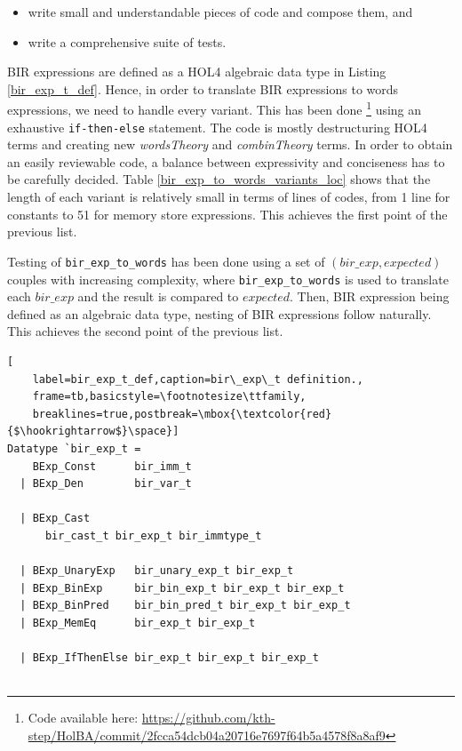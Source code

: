 \documentclass{kththesis}
\begin{document}
{\begin{itemize}
    \item write small and understandable pieces of code and compose them, and
    \item write a comprehensive suite of tests.
\end{itemize}

BIR expressions are defined as a HOL4 algebraic data type in Listing \ref{bir_exp_t_def}. Hence, in order to translate BIR expressions to words expressions, we need to handle every variant. This has been done \footnote{Code available here: \url{https://github.com/kth-step/HolBA/commit/2fcca54dcb04a20716e7697f64b5a4578f8a8af9}} using an exhaustive \texttt{if-then-else} statement\footnotemark. The code is mostly destructuring HOL4 terms and creating new \textit{wordsTheory} and \textit{combinTheory} terms. In order to obtain an easily reviewable code, a balance between expressivity and conciseness has to be carefully decided. Table \ref{bir_exp_to_words_variants_loc} shows that the length of each variant is relatively small in terms of lines of codes, from 1 line for constants to 51 for memory store expressions. This achieves the first point of the previous list.


Testing of \texttt{bir\_exp\_to\_words} has been done using a set of $(bir\_exp,expected)$ couples with increasing complexity, where \texttt{bir\_exp\_to\_words} is used to translate each $bir\_exp$ and the result is compared to $expected$. Then, BIR expression being defined as an algebraic data type, nesting of BIR expressions follow naturally. This achieves the second point of the previous list.

\begin{lstlisting}[
    label=bir_exp_t_def,caption=bir\_exp\_t definition.,
    frame=tb,basicstyle=\footnotesize\ttfamily,
    breaklines=true,postbreak=\mbox{\textcolor{red}{$\hookrightarrow$}\space}]
Datatype `bir_exp_t =
    BExp_Const      bir_imm_t
  | BExp_Den        bir_var_t

  | BExp_Cast
  	  bir_cast_t bir_exp_t bir_immtype_t

  | BExp_UnaryExp   bir_unary_exp_t bir_exp_t
  | BExp_BinExp     bir_bin_exp_t bir_exp_t bir_exp_t
  | BExp_BinPred    bir_bin_pred_t bir_exp_t bir_exp_t
  | BExp_MemEq      bir_exp_t bir_exp_t

  | BExp_IfThenElse bir_exp_t bir_exp_t bir_exp_t


\end{lstlisting}}
\end{document}
